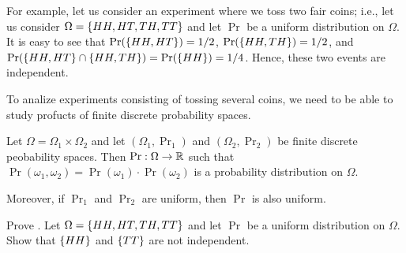 For example, let us consider an experiment where we toss two fair coins; i.e.,
let us consider $\Omega = \set{HH, HT, TH, TT}$ and let $\Pr$ be a uniform
distribution on $\Omega$. It is easy to see that $\Pr(\set{HH, HT}) = 1 / 2$,
$\Pr(\set{HH, TH}) = 1 / 2$, and $\Pr(\set{HH, HT} \cap \set{HH, TH}) =
\Pr(\set{HH}) =  1 / 4$. Hence, these two events are independent.

To analize experiments consisting of tossing several coins, we need to be able
to study profucts of finite discrete probability spaces.
\begin{theorem}
  Let $\Omega = \Omega_1 \times \Omega_2$ and let $(\Omega_1, \Pr_1)$ and
  $(\Omega_2, \Pr_2)$ be finite discrete peobability spaces. Then $\Pr : \Omega
  \to {\mathbb{R}}$ such that $\Pr(\omega_1, \omega_2) = \Pr(\omega_1) \cdot
  \Pr(\omega_2)$ is a probability distribution on $\Omega$.

  Moreover, if $\Pr_1$ and $\Pr_2$ are uniform, then $\Pr$ is also uniform.
\end{theorem}

\begin{chapterendexercises}
  \exercise Prove .
  \exercise Let $\Omega = \set{HH, HT, TH, TT}$ and let $\Pr$ be a uniform
    distribution on $\Omega$. Show that $\set{HH}$ and $\set{TT}$ are not
    independent.
\end{chapterendexercises}
